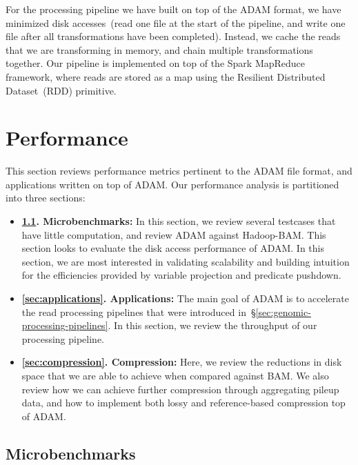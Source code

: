 \documentclass[10pt,twocolumn]{article}
\theoremstyle{plain}
\begin{document}
For the processing pipeline we have built on top of the ADAM format, we have minimized disk accesses~(read one file at the
start of the pipeline, and write one file after all transformations have been completed). Instead, we cache the reads that we are
transforming in memory, and chain multiple transformations together. Our pipeline is implemented on top of the Spark MapReduce
framework, where reads are stored as a map using the Resilient Distributed Dataset~(RDD) primitive.

\section{Performance}
\label{sec:performance}

This section reviews performance metrics pertinent to the ADAM file format, and applications written on top of ADAM. Our performance
analysis is partitioned into three sections:

\begin{itemize}
\item {\bf \ref{sec:microbenchmarks}. Microbenchmarks:} In this section, we review several testcases that have little computation, and
review ADAM against Hadoop-BAM. This section looks to evaluate the disk access performance of ADAM. In this section, we are most
interested in validating scalability and building intuition for the efficiencies provided by variable projection and predicate pushdown.
\item {\bf \ref{sec:applications}. Applications:} The main goal of ADAM is to accelerate the read processing pipelines that were introduced
in~\S\ref{sec:genomic-processing-pipelines}. In this section, we review the throughput of our processing pipeline.
\item {\bf \ref{sec:compression}. Compression:} Here, we review the reductions in disk space that we are able to achieve when compared
against BAM. We also review how we can achieve further compression through aggregating pileup data, and how to implement both
lossy and reference-based compression top of ADAM.
\end{itemize}

\subsection{Microbenchmarks}
\label{sec:microbenchmarks}
\end{document}
